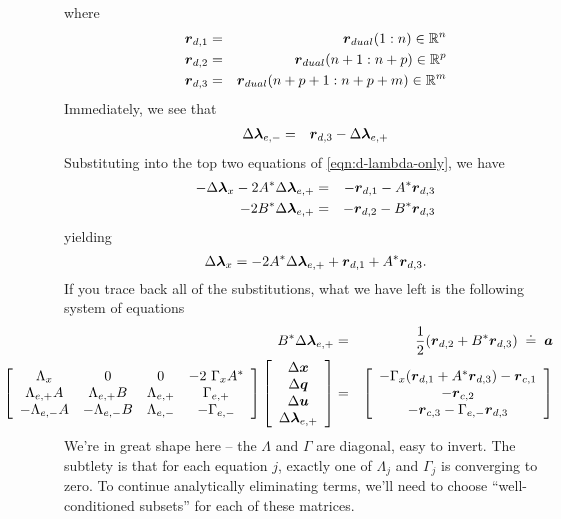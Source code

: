 where 
\begin{eqnarray*} 
\boldsymbol{r}_{d,1} &=& \boldsymbol{r}_{dual}(1:n) \in \mathbb R^n \\
\boldsymbol{r}_{d,2} &=& \boldsymbol{r}_{dual}(n+1:n+p) \in \mathbb R^p \\
\boldsymbol{r}_{d,3} &=& \boldsymbol{r}_{dual}(n+p+1:n+p+m) \in \mathbb R^m \\
\end{eqnarray*} 
Immediately, we see that 
\begin{eqnarray}
\Delta \boldsymbol{\lambda}_{e,-} &=& \boldsymbol{r}_{d,3} - \Delta \boldsymbol{\lambda}_{e,+}
\end{eqnarray}
Substituting into the top two equations of \eqref{eqn:d-lambda-only}, we have
\begin{eqnarray}
-\Delta \boldsymbol{\lambda}_{x} - 2 A^* \Delta \boldsymbol{\lambda}_{e,+} &=& - \boldsymbol{r}_{d,1} - A^* \boldsymbol{r}_{d,3} \\
-2 B^* \Delta \boldsymbol{\lambda}_{e,+} &=& -\boldsymbol{r}_{d,2} - B^* \boldsymbol{r}_{d,3}
\end{eqnarray}
yielding
\begin{equation}
\Delta \boldsymbol{\lambda}_{x} = -2 A^* \Delta \boldsymbol{\lambda}_{e,+} +  \boldsymbol{r}_{d,1} + A^* \boldsymbol{r}_{d,3} .
\end{equation}
If you trace back all of the substitutions, what we have left is the following system of equations
\begin{eqnarray*}
B^* \Delta \blambda_{e,+} &=& \frac{1}{2} ( \r_{d,2} + B^* \r_{d,3} ) \;\doteq\; \a \\
\hspace{-.75in}\left[ \begin{array}{cccc} \Lambda_{x} & 0 & 0 & -2 \ \Gamma_{x} A^* \\ \Lambda_{e,+}A & \Lambda_{e,+} B & \Lambda_{e,+} & \Gamma_{e,+} \\ 
-\Lambda_{e,-} A& -\Lambda_{e,-} B & \Lambda_{e,-} & -\Gamma_{e,-} \end{array} \right] \left[ \begin{array}{c} \Delta \x \\ \Delta \q \\ \Delta \u \\ \Delta \blambda_{e,+} \end{array} \right] &=& \left[ \begin{array}{c} -\Gamma_{x} (\r_{d,1} + A^*\r_{d,3}) -\r_{c,1} \\ -\r_{c,2} \\ -\r_{c,3}-\Gamma_{e,-} \r_{d,3} \end{array} \right]
\end{eqnarray*}
We're in great shape here -- the $\Lambda$ and $\Gamma$ are diagonal, easy to invert. The subtlety is that for each equation $j$, exactly one of $\Lambda_j$ and $\Gamma_j$ is converging to zero. To continue analytically eliminating terms, we'll need to choose ``well-conditioned subsets'' for each of these matrices. 

